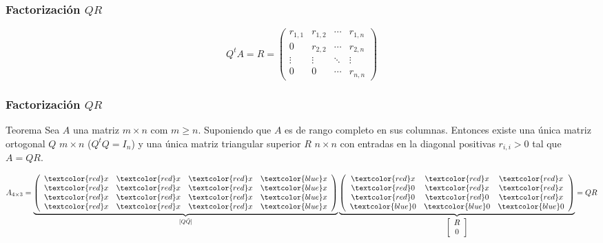 \documentclass{beamer}
\begin{document}
\begin{frame}
  \frametitle{Factorizaci\'on $QR$}
  $$
Q^tA = R = \left(\begin{array}{cccc}
         r_{1,1} & r_{1,2} & \cdots & r_{1,n} \\
         0 & r_{2,2} & \cdots & r_{2,n} \\
         \vdots & \vdots & \ddots & \vdots \\
         0 & 0 & \cdots & r_{n,n}
         \end{array}\right)
$$
\end{frame}
\begin{frame}
  \frametitle{Factorizaci\'on $QR$}
  \begin{block}{Teorema}
    Sea $A$ una matriz $m\times n$ com $m\geq n$. Suponiendo que $A$ es de rango completo en sus
columnas. Entonces existe una \'unica matriz ortogonal $Q$ $m \times n$ ($Q^tQ=I_n$) y una \'unica matriz
triangular superior $R$ $n \times n$ con entradas en la diagonal positivas $r_{i,i}>0$ tal que $A=QR$.
  \end{block}
  $$
A_{4\times3}=\underbrace{\left(\begin{array}{cccc}
         \textcolor{red}x & \textcolor{red}x  & \textcolor{red}x & \textcolor{blue}x\\
         \textcolor{red}x & \textcolor{red}x  & \textcolor{red}x & \textcolor{blue}x\\
         \textcolor{red}x & \textcolor{red}x  & \textcolor{red}x & \textcolor{blue}x\\
         \textcolor{red}x & \textcolor{red}x  & \textcolor{red}x & \textcolor{blue}x
        \end{array}\right)}_{[Q \tilde Q]}\underbrace{\left(\begin{array}{ccc}
                                                             \textcolor{red}x & \textcolor{red}x & \textcolor{red}x\\
                                                             \textcolor{red}0 & \textcolor{red}x & \textcolor{red}x\\
                                                             \textcolor{red}0 & \textcolor{red}0 & \textcolor{red}x\\
                                                             \textcolor{blue}0 & \textcolor{blue}0 & \textcolor{blue}0\\
                                                            \end{array}\right)}_{\left[\begin{array}{c}
                                                                R\\
                                                                0
                                                               \end{array}\right]}=QR
$$
\end{frame}
\end{document}
